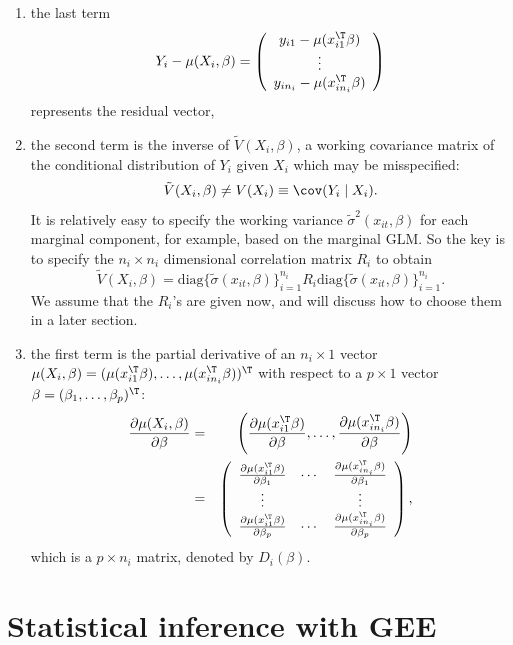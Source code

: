 \begin{enumerate}
[(GEE1)]
\item the last term 
\[
Y_{i}-\mu(X_{i},\beta)=\left(\begin{array}{c}
y_{i1} -\mu(x_{i1}^{\T}\beta)\\
\vdots\\
y_{in_{i}} -\mu(x_{in_{i}}^{\T}\beta)
\end{array}\right)
\]
represents the residual vector,
\item the second term is the inverse of $\tilde{V}(X_{i}, \beta)$, a working covariance
matrix of the conditional distribution of $Y_{i}$ given $X_{i}$
which may be misspecified:
\[
\tilde{V}(X_{i}, \beta)\neq V(X_{i})\equiv\cov(Y_{i}\mid X_{i}).
\]
It is relatively easy to specify the working variance $\tilde{\sigma}^2(x_{it}, \beta)$ for each marginal component, for example, based on the marginal GLM.  So the key is to specify the $n_i\times n_i$ dimensional correlation matrix $R_i$ to obtain 
$$
\tilde{V}(X_{i}, \beta) = \text{diag}\{ \tilde{\sigma} (x_{it}, \beta) \}_{i=1}^{n_i} R_i \text{diag}\{ \tilde{\sigma} (x_{it}, \beta) \}_{i=1}^{n_i}.
$$
We assume that the $R_i$'s are given now, and will discuss how to choose them in a later section. 
\item the first term is the partial derivative of an $n_i \times 1$ 
vector $\mu (X_{i},\beta)=(\mu(x_{i1}^{\T}\beta),\ldots,\mu(x_{in_{i}}^{\T}\beta))^{\T}$
with respect to a $p\times1$ vector $\beta=(\beta_{1},\ldots,\beta_{p})^{\T}$:
\begin{eqnarray*}
\frac{\partial\mu (X_{i},\beta)}{\partial\beta}
&=& \left(  \frac{\partial \mu(x_{i1}^{\T}\beta)}{\partial \beta},\ldots,  \frac{ \partial  \mu(x_{in_{i}}^{\T}\beta)}{\partial \beta} \right)  \\
&=&\left(\begin{array}{ccc}
\frac{\partial\mu(x_{i1}^{\T}\beta)}{\partial\beta_{1}} & \cdots & \frac{\partial\mu(x_{in_{i}}^{\T}\beta)}{\partial\beta_{1}}\\
\vdots &  & \vdots\\
\frac{\partial\mu(x_{i1}^{\T}\beta)}{\partial\beta_{p}} & \cdots & \frac{\partial\mu(x_{in_{i}}^{\T}\beta)}{\partial\beta_{p}}
\end{array}\right),
\end{eqnarray*}
which is a $p\times n_i$ matrix, denoted by $D_{i} (\beta).$
\end{enumerate}

\section{Statistical inference with GEE}

